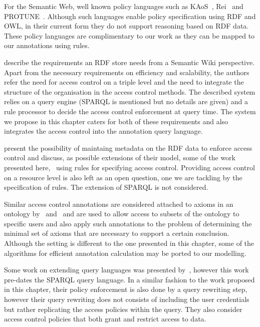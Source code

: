 For the Semantic Web, well known policy languages such as KAoS~\cite{Bradshaw1997}, Rei~\cite{Kagal2003} and
PROTUNE~\cite{Bonatti2009}.  Although such languages enable policy specification using \ac{RDF} and \ac{OWL}, in their
current form they do not support reasoning based on \ac{RDF} data.  These policy languages are complimentary to our work
as they can be mapped to our annotations using rules.


\citet{DietzoldAuer2006aa} describe the requirements an \ac{RDF} store needs from a Semantic Wiki perspective.  Apart
from the necessary requirements on efficiency and scalability, the authors refer the need for access control on a triple
level and the need to integrate the structure of the organisation in the access control methods.  The described system
relies on a query engine (SPARQL is mentioned but no details are given) and a rule processor to decide the access
control enforcement at query time.
%
The system we propose in this chapter caters for both of these requirements and also integrates the access control into
the annotation query language.

\citet{HollenbachPresbreyBerners-Lee:2005aa} present the possibility of maintaing metadata on the \ac{RDF} data to
enforce access control and discuss, as possible extensions of their model, some of the work presented here, \eg~using
rules for specifying access control.  Providing access control on a resource level is also left as an open question, one
we are tackling by the specification of rules.  The extension of SPARQL is not considered.


Similar access control annotations are considered attached to axioms in an ontology
by~\citet{KnechtelStuckenschmidt:2010aa} and~\citet{BaaderKnechtelPenaloza:2009aa} and are used to allow access to
subsets of the ontology to specific users and also apply such annotations to the problem of determining the minimal set
of axioms that are necessary to support a certain conclusion.  Although the setting is different to the one presented in
this chapter, some of the algorithms for efficient annotation calculation may be ported to our modelling.


Some work on extending query languages was presented by~\citet{AbelCoiHenze2007aa}, however this work pre-dates the
SPARQL query language.  In a similar fashion to the work proposed in this chapter, their policy enforcement is also done
by a query rewriting step, however their query rewriting does not consists of including the user credentials but rather
replicating the access policies within the query.  
%
They also consider access control policies that both grant and restrict access to data.

